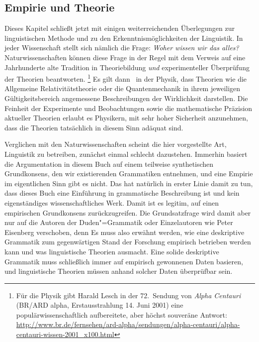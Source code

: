\subsection{Empirie und Theorie}

\label{sec:deskriptivtheoretisch}


Dieses Kapitel schließt jetzt mit einigen weiterreichenden Überlegungen zur linguistischen Methode und zu den Erkenntnismöglichkeiten der Linguistik.
In jeder Wissenschaft stellt sich nämlich die Frage:
\textit{Woher wissen wir das alles?}
Naturwissenschaften können diese Frage in der Regel mit dem Verweis auf eine Jahrhunderte alte Tradition in Theoriebildung \textit{und} experimenteller Überprüfung der Theorien beantworten.%
\footnote{Für die Physik gibt Harald Lesch in der 72.\ Sendung von \textit{Alpha Centauri} (BR\slash ARD alpha, Erstausstrahlung 14. Juni 2001) eine populärwissenschaftlich aufbereitete, aber höchst souveräne Antwort: \url{http://www.br.de/fernsehen/ard-alpha/sendungen/alpha-centauri/alpha-centauri-wissen-2001_x100.html}}
Es gilt dann \zB\ in der Physik, dass Theorien wie die Allgemeine Relativitätstheorie oder die Quantenmechanik in ihrem jeweiligen Gültigkeitsbereich angemessene Beschreibungen der Wirklichkeit darstellen.
Die Feinheit der Experimente und Beobachtungen sowie die mathematische Präzision aktueller Theorien erlaubt es Physikern, mit sehr hoher Sicherheit anzunehmen, dass die Theorien tatsächlich in diesem Sinn adäquat sind.

Verglichen mit den Naturwissenschaften scheint die hier vorgestellte Art, Linguistik zu betreiben, zunächst einmal schlecht dazustehen.
Immerhin basiert die Argumentation in diesem Buch auf einem teilweise synthetischen Grundkonsens, den wir existierenden Grammatiken entnehmen, und eine Empirie im eigentlichen Sinn gibt es nicht.
Das hat natürlich in erster Linie damit zu tun, dass dieses Buch eine Einführung in grammatische Beschreibung ist und kein eigenständiges wissenschaftliches Werk.
Damit ist es legitim, auf einen empirischen Grundkonsens zurückzugreifen.
Die Grundsatzfrage wird damit aber nur auf die Autoren der Duden"=Grammatik oder Einzelautoren wie Peter Eisenberg verschoben, denn  
Es muss also erwähnt werden, wie eine deskriptive Grammatik zum gegenwärtigen Stand der Forschung empirisch betrieben werden kann und was linguistische Theorien ausmacht.
Eine solide deskriptive Grammatik muss schließlich immer auf empirisch gewonnenen Daten basieren, und linguistische Theorien müssen anhand solcher Daten überprüfbar sein. 

